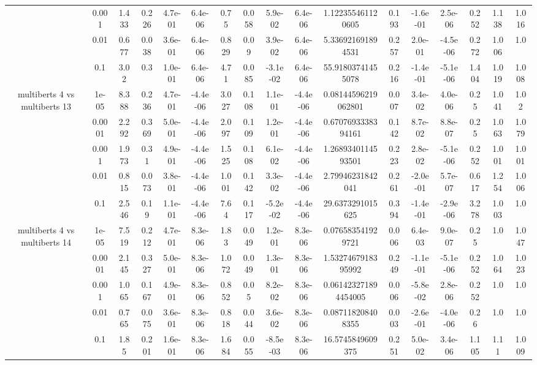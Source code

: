 \begin{tabular}{|c|c|c|c|c|c|c|c|c|c|c|c|c|c|c|c|c|}
 & 0.001 & 1.433 & 0.226 & 4.7e-01 & 6.4e-06 & 0.75 & 0.058 & 5.9e-02 & 6.4e-06 & 1.122355461120605 & 0.193 & -1.6e-01 & 2.5e-06 & 0.252 & 1.138 & 1.016 \\
 & 0.01 & 0.677 & 0.038 & 3.6e-01 & 6.4e-06 & 0.829 & 0.09 & 3.9e-02 & 6.4e-06 & 5.336921691894531 & 0.257 & 2.0e-01 & -4.5e-06 & 0.272 & 1.006 & 1.0 \\
 & 0.1 & 3.02 & 0.3 & 1.0e-01 & 6.4e-06 & 4.71 & 0.085 & -3.1e-02 & 6.4e-06 & 55.91803741455078 & 0.216 & -1.4e-01 & -5.1e-06 & 1.404 & 1.019 & 1.008 \\
\hline
\multirow{5}{*}{multiberts 4 vs multiberts 13} & 1e-05 & 8.388 & 0.236 & 4.7e-01 & -4.4e-06 & 3.027 & 0.108 & 1.1e-01 & -4.4e-06 & 0.08144596219062801 & 0.007 & 3.4e-02 & 4.0e-06 & 0.25 & 1.041 & 1.02 \\
 & 0.0001 & 2.292 & 0.369 & 5.0e-01 & -4.4e-06 & 2.097 & 0.109 & 1.2e-01 & -4.4e-06 & 0.6707693338394161 & 0.142 & 8.7e-02 & 8.8e-07 & 0.25 & 1.063 & 1.079 \\
 & 0.001 & 1.973 & 0.31 & 4.9e-01 & -4.4e-06 & 1.525 & 0.108 & 6.1e-02 & -4.4e-06 & 1.2689340114593501 & 0.223 & 2.8e-02 & -5.1e-06 & 0.252 & 1.001 & 1.001 \\
 & 0.01 & 0.815 & 0.073 & 3.8e-01 & -4.4e-06 & 1.001 & 0.142 & 3.3e-02 & -4.4e-06 & 2.79946231842041 & 0.261 & -2.0e-01 & 5.7e-07 & 0.617 & 1.254 & 1.006 \\
 & 0.1 & 2.546 & 0.19 & 1.1e-01 & -4.4e-06 & 7.64 & 0.117 & -5.2e-02 & -4.4e-06 & 29.6373291015625 & 0.394 & -1.4e-01 & -2.9e-06 & 3.278 & 1.003 & 1.0 \\
\hline
\multirow{5}{*}{multiberts 4 vs multiberts 14} & 1e-05 & 7.519 & 0.212 & 4.7e-01 & 8.3e-06 & 1.83 & 0.049 & 1.2e-01 & 8.3e-06 & 0.076583541929721 & 0.006 & 6.4e-03 & 9.0e-07 & 0.25 & 1.0 & 1.047 \\
 & 0.0001 & 2.145 & 0.327 & 5.0e-01 & 8.3e-06 & 1.072 & 0.049 & 1.3e-01 & 8.3e-06 & 1.5327467918395992 & 0.249 & -1.1e-01 & -5.1e-06 & 0.252 & 1.064 & 1.023 \\
 & 0.001 & 1.065 & 0.167 & 4.9e-01 & 8.3e-06 & 0.852 & 0.05 & 8.2e-02 & 8.3e-06 & 0.061423271894454005 & 0.006 & -5.8e-02 & 2.8e-06 & 0.252 & 1.0 & 1.0 \\
 & 0.01 & 0.765 & 0.075 & 3.6e-01 & 8.3e-06 & 0.818 & 0.044 & 3.6e-02 & 8.3e-06 & 0.087118208408355 & 0.003 & -2.6e-01 & -4.0e-06 & 0.26 & 1.0 & 1.0 \\
 & 0.1 & 1.85 & 0.201 & 1.6e-01 & 8.3e-06 & 1.684 & 0.055 & -8.5e-03 & 8.3e-06 & 16.5745849609375 & 0.251 & 5.0e-02 & 3.4e-06 & 1.105 & 1.11 & 1.009 \\

\end{tabular}
